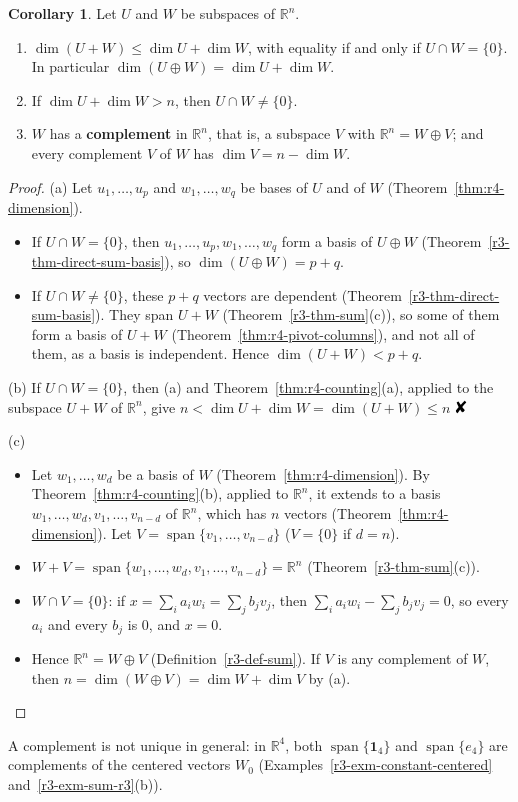 \documentclass[12pt]{article}
\newcommand{\R}{\mathbb R}
\newcommand{\contradiction}{\mathord{\text{\large\ding{56}}}}
\newcommand{\one}{\mathbf 1}
\DeclareMathOperator{\Span}{span}
\theoremstyle{definition}
\newtheorem{corollary}[theorem]{Corollary}
\begin{document}
\begin{corollary}\label{cor:r4-dim-sum}
Let \(U\) and \(W\) be subspaces of \(\R^n\).
\begin{enumerate}
\item \(\dim(U+W)\leqslant\dim U+\dim W\), with equality if and only if \(U\cap W=\{0\}\). In particular
\(\dim(U\oplus W)=\dim U+\dim W\).
\item If \(\dim U+\dim W>n\), then \(U\cap W\ne\{0\}\).
\item \(W\) has a \textbf{complement} in \(\R^n\), that is, a subspace \(V\) with \(\R^n=W\oplus V\); and every
complement \(V\) of \(W\) has \(\dim V=n-\dim W\).
\end{enumerate}
\end{corollary}
\begin{proof}
(a) Let \(u_1,\dots,u_p\) and \(w_1,\dots,w_q\) be bases of \(U\) and of \(W\) (Theorem~\ref{thm:r4-dimension}).
\begin{itemize}
\item If \(U\cap W=\{0\}\), then \(u_1,\dots,u_p,w_1,\dots,w_q\) form a basis of \(U\oplus W\)
(Theorem~\ref{r3-thm-direct-sum-basis}), so \(\dim(U\oplus W)=p+q\).
\item If \(U\cap W\ne\{0\}\), these \(p+q\) vectors are dependent (Theorem~\ref{r3-thm-direct-sum-basis}). They span
\(U+W\) (Theorem~\ref{r3-thm-sum}(c)), so some of them form a basis of \(U+W\)
(Theorem~\ref{thm:r4-pivot-columns}), and not all of them, as a basis is independent. Hence \(\dim(U+W)<p+q\).
\end{itemize}
(b) If \(U\cap W=\{0\}\), then (a) and Theorem~\ref{thm:r4-counting}(a), applied to the subspace \(U+W\) of \(\R^n\),
give \(n<\dim U+\dim W=\dim(U+W)\leqslant n\) \(\contradiction\)

(c)
\begin{itemize}
\item Let \(w_1,\dots,w_d\) be a basis of \(W\) (Theorem~\ref{thm:r4-dimension}). By
Theorem~\ref{thm:r4-counting}(b), applied to \(\R^n\), it extends to a basis \(w_1,\dots,w_d,v_1,\dots,v_{n-d}\) of
\(\R^n\), which has \(n\) vectors (Theorem~\ref{thm:r4-dimension}). Let \(V=\Span\{v_1,\dots,v_{n-d}\}\)
(\(V=\{0\}\) if \(d=n\)).
\item \(W+V=\Span\{w_1,\dots,w_d,v_1,\dots,v_{n-d}\}=\R^n\) (Theorem~\ref{r3-thm-sum}(c)).
\item \(W\cap V=\{0\}\): if \(x=\sum_ia_iw_i=\sum_jb_jv_j\), then \(\sum_ia_iw_i-\sum_jb_jv_j=0\), so every \(a_i\)
and every \(b_j\) is \(0\), and \(x=0\).
\item Hence \(\R^n=W\oplus V\) (Definition~\ref{r3-def-sum}). If \(V\) is any complement of \(W\), then
\(n=\dim(W\oplus V)=\dim W+\dim V\) by (a).\qedhere
\end{itemize}
\end{proof}
A complement is not unique in general: in \(\R^4\), both \(\Span\{\one_4\}\) and \(\Span\{e_4\}\) are complements of
the centered vectors \(W_0\) (Examples~\ref{r3-exm-constant-centered} and~\ref{r3-exm-sum-r3}(b)).
\end{document}
